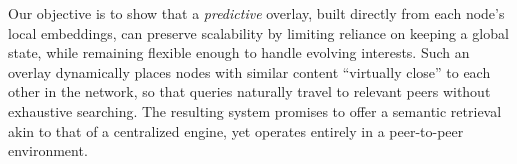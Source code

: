 \documentclass[10pt,journal]{IEEEtran}
\begin{document}

Our objective is to show that a \emph{predictive} overlay, built directly from each node’s local embeddings, can preserve scalability by limiting reliance on keeping a global state, while remaining flexible enough to handle evolving interests. Such an overlay dynamically places nodes with similar content ``virtually close'' to each other in the network, so that queries naturally travel to relevant peers without exhaustive searching. The resulting system promises to offer a semantic retrieval akin to that of a centralized engine, yet operates entirely in a peer-to-peer environment. %

%

\end{document}
